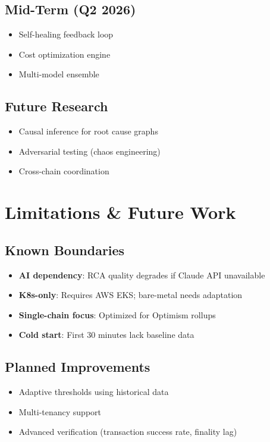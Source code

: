 \documentclass[11pt,a4paper]{article}
\begin{document}
\subsection{Mid-Term (Q2 2026)}
\begin{itemize}
    \item Self-healing feedback loop
    \item Cost optimization engine
    \item Multi-model ensemble
\end{itemize}

\subsection{Future Research}
\begin{itemize}
    \item Causal inference for root cause graphs
    \item Adversarial testing (chaos engineering)
    \item Cross-chain coordination
\end{itemize}

\section{Limitations \& Future Work}

\subsection{Known Boundaries}
\begin{itemize}
    \item \textbf{AI dependency}: RCA quality degrades if Claude API unavailable
    \item \textbf{K8s-only}: Requires AWS EKS; bare-metal needs adaptation
    \item \textbf{Single-chain focus}: Optimized for Optimism rollups
    \item \textbf{Cold start}: First 30 minutes lack baseline data
\end{itemize}

\subsection{Planned Improvements}
\begin{itemize}
    \item Adaptive thresholds using historical data
    \item Multi-tenancy support
    \item Advanced verification (transaction success rate, finality lag)
\end{itemize}
\end{document}
